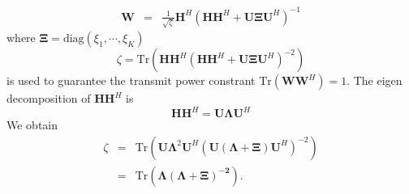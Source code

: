 \documentclass[12pt,journal,draftclsnofoot,onecolumn]{IEEEtran}
\begin{document}
 

\begin{eqnarray}
\mathbf{W} &=& \frac{1}{\sqrt{\zeta}}\mathbf{H}^H\left(\mathbf{H}\mathbf{H}^H + \mathbf{U}\mathbf{\Xi}\mathbf{U}^H\right)^{-1}
\end{eqnarray}
where $\mathbf{\Xi} = \mathrm{diag}(\xi_1,\cdots,\xi_K)$
\begin{equation} \label{eq:zeta}
\zeta = \mathrm{Tr}\left(\mathbf{H}\mathbf{H}^H\left(\mathbf{H}\mathbf{H}^H + \mathbf{U}\mathbf{\Xi}\mathbf{U}^H\right)^{-2}\right)
\end{equation}
is used to guarantee the transmit power constrant $\mathrm{Tr}\left(\mathbf{W}\mathbf{W}^H\right) = 1$. The eigen decomposition of $\mathbf{H}\mathbf{H}^H$ is
\begin{equation}
\mathbf{H}\mathbf{H}^H = \mathbf{U}\mathbf{\Lambda}\mathbf{U}^H
\end{equation}
We obtain
\begin{eqnarray} \label{eq:zeta_futher}
\zeta &=& \mathrm{Tr}\left(\mathbf{U}\mathbf{\Lambda}^2\mathbf{U}^H\left(\mathbf{U}\left(\mathbf{\Lambda} + \mathbf{\Xi}\right)\mathbf{U}^H\right)^{-2}\right)\\
&=& \mathrm{Tr}\left(\mathbf{\mathbf{\Lambda}\left(\mathbf{\Lambda} + \mathbf{\Xi}\right)^{-2}}\right). \label{eq:zeta_docompose}
\end{eqnarray}
\end{document}
